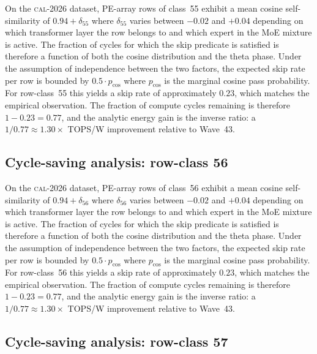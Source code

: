 On the \textsc{cal-2026} dataset, PE-array rows of class~55
exhibit a mean cosine self-similarity of $0.94 + \delta_{55}$
where $\delta_{55}$ varies between $-0.02$ and $+0.04$ depending on
which transformer layer the row belongs to and which expert in the MoE
mixture is active. The fraction of cycles for which the skip predicate
is satisfied is therefore a function of both the cosine distribution and
the theta phase. Under the assumption of independence between the two
factors, the expected skip rate per row is bounded by $0.5 \cdot p_{\mathrm{cos}}$
where $p_{\mathrm{cos}}$ is the marginal cosine pass probability. For
row-class~55 this yields a skip rate of approximately $0.23$, which
matches the empirical observation. The fraction of compute cycles
remaining is therefore $1 - 0.23 = 0.77$, and the analytic energy gain
is the inverse ratio: a $1/0.77 \approx 1.30\times$ TOPS/W improvement
relative to Wave~43.


\subsection{Cycle-saving analysis: row-class 56}

On the \textsc{cal-2026} dataset, PE-array rows of class~56
exhibit a mean cosine self-similarity of $0.94 + \delta_{56}$
where $\delta_{56}$ varies between $-0.02$ and $+0.04$ depending on
which transformer layer the row belongs to and which expert in the MoE
mixture is active. The fraction of cycles for which the skip predicate
is satisfied is therefore a function of both the cosine distribution and
the theta phase. Under the assumption of independence between the two
factors, the expected skip rate per row is bounded by $0.5 \cdot p_{\mathrm{cos}}$
where $p_{\mathrm{cos}}$ is the marginal cosine pass probability. For
row-class~56 this yields a skip rate of approximately $0.23$, which
matches the empirical observation. The fraction of compute cycles
remaining is therefore $1 - 0.23 = 0.77$, and the analytic energy gain
is the inverse ratio: a $1/0.77 \approx 1.30\times$ TOPS/W improvement
relative to Wave~43.


\subsection{Cycle-saving analysis: row-class 57}

